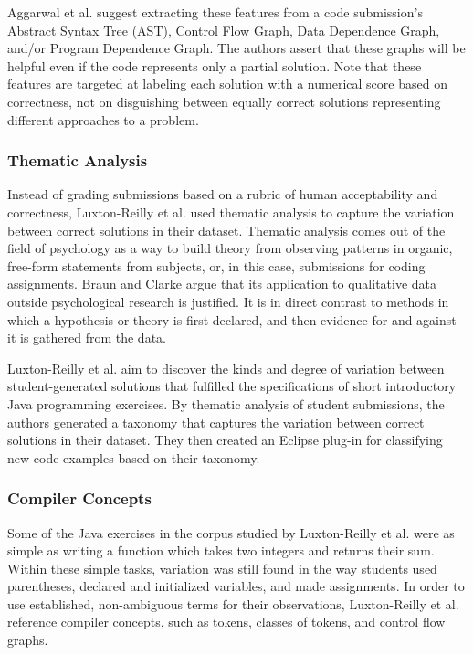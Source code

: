 \documentclass[12pt]{article}
\begin{document}
Aggarwal et al. suggest extracting these features from a code submission's Abstract Syntax Tree (AST), Control Flow Graph, Data Dependence Graph, and/or Program Dependence Graph. The authors assert that these graphs will be helpful even if the code represents only a partial solution. Note that these features are targeted at labeling each solution with a numerical score based on correctness, not on disguishing between equally correct solutions representing different approaches to a problem.


\subsubsection{Thematic Analysis}

Instead of grading submissions based on a rubric of human acceptability and correctness, Luxton-Reilly et al. \cite{Luxton13} used thematic analysis to capture the variation between correct solutions in their dataset. Thematic analysis comes out of the field of psychology as a way to build theory from observing patterns in organic, free-form statements from subjects, or, in this case, submissions for coding assignments. Braun and Clarke \cite{thematic06} argue that its application to qualitative data outside psychological research is justified. It is in direct contrast to methods in which a hypothesis or theory is first declared, and then evidence for and against it is gathered from the data. 

Luxton-Reilly et al. \cite{Luxton13} aim to discover the kinds and degree of variation between student-generated solutions that fulfilled the specifications of short introductory Java programming exercises . By thematic analysis of student submissions, the authors generated a taxonomy that captures the variation between correct solutions in their dataset. They then created an Eclipse plug-in for classifying new code examples based on their taxonomy. 

\subsubsection{Compiler Concepts}

Some of the Java exercises in the corpus studied by Luxton-Reilly et al. \cite{Luxton13} were as simple as writing a function which takes two integers and returns their sum. Within these simple tasks, variation was still found in the way students used parentheses, declared and initialized variables, and made assignments. In order to use established, non-ambiguous terms for their observations, Luxton-Reilly et al. reference compiler concepts, such as tokens, classes of tokens, and control flow graphs. 
\end{document}

